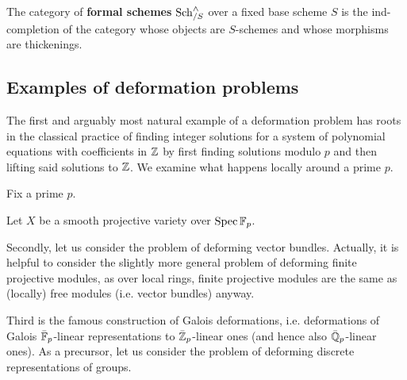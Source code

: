             \begin{definition} \label{def: formal_schemes}
                The category of \textbf{formal schemes} $\mathrm{Sch}_{/S}^{\wedge}$ over a fixed base scheme $S$ is the ind-completion of the category whose objects are $S$-schemes and whose morphisms are thickenings.
            \end{definition}
            \begin{definition} \label{def: versal_miniversal_and_universal_deformations}
                
            \end{definition}

        \subsection{Examples of deformation problems}
            The first and arguably most natural example of a deformation problem has roots in the classical practice of finding integer solutions for a system of polynomial equations with coefficients in $\mathbb{Z}$ by first finding solutions modulo $p$ and then lifting said solutions to $\mathbb{Z}$. We examine what happens locally around a prime $p$.
            \begin{example}
                Fix a prime $p$.
            
                Let $X$ be a smooth projective variety over $\operatorname{Spec} \mathbb{F}_p$.  
            \end{example}

            Secondly, let us consider the problem of deforming vector bundles. Actually, it is helpful to consider the slightly more general problem of deforming finite projective modules, as over local rings, finite projective modules are the same as (locally) free modules (i.e. vector bundles) anyway.
            \begin{example}
                
            \end{example}

            Third is the famous construction of Galois deformations, i.e. deformations of Galois $\bar{\mathbb{F}}_p$-linear representations to $\bar{\mathbb{Z}}_p$-linear ones (and hence also $\bar{\mathbb{Q}}_p$-linear ones). As a precursor, let us consider the problem of deforming discrete representations of groups.
            \begin{example}
                
            \end{example}
            \begin{example}
                
            \end{example}

